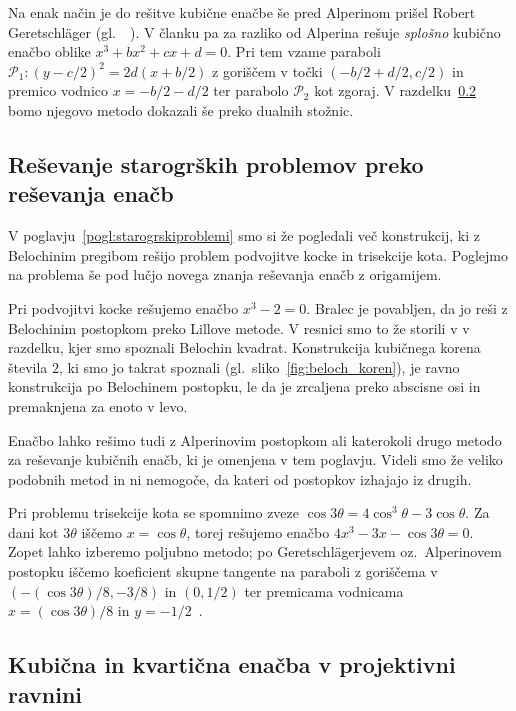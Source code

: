\begin{opomba}
    \label{opom:geret_metoda}
    Na enak način je do rešitve kubične enačbe še pred Alperinom prišel Robert Geretschläger (gl.\ ~\cite[368--369]{geret1995}). V članku pa za razliko od Alperina rešuje \emph{splošno} kubično enačbo oblike $x^3 + bx^2 + cx + d = 0$. Pri tem vzame paraboli $\mathcal{P}_1: (y-c/2)^2 = 2d(x+b/2)$ z goriščem v točki $(-b/2+d/2, c/2)$ in premico vodnico $x = -b/2-d/2$ ter parabolo $\mathcal{P}_2$ kot zgoraj. V razdelku~\ref{podpogl:afina_proj_enacbe} bomo njegovo metodo dokazali še preko dualnih stožnic.
\end{opomba}

\subsection{Reševanje starogrških problemov preko reševanja enačb}

V poglavju~\ref{pogl:starogrskiproblemi} smo si že pogledali več konstrukcij, ki z Belochinim pregibom rešijo problem podvojitve kocke in trisekcije kota. Poglejmo na problema še pod lučjo novega znanja reševanja enačb z origamijem.

Pri podvojitvi kocke rešujemo enačbo $x^3 - 2 = 0$. Bralec je povabljen, da jo reši z Belochinim postopkom preko Lillove metode. V resnici smo to že storili v v razdelku, kjer smo spoznali Belochin kvadrat. Konstrukcija kubičnega korena števila $2$, ki smo jo takrat spoznali (gl.\ sliko~\ref{fig:beloch_koren}), je ravno konstrukcija po Belochinem postopku, le da je zrcaljena preko abscisne osi in premaknjena za enoto v levo.

Enačbo lahko rešimo tudi z Alperinovim postopkom ali katerokoli drugo metodo za reševanje kubičnih enačb, ki je omenjena v tem poglavju. Videli smo že veliko podobnih metod in ni nemogoče, da kateri od postopkov izhajajo iz drugih.

Pri problemu trisekcije kota se spomnimo zveze $\cos 3\theta = 4 \cos^3 \theta - 3 \cos \theta$. Za dani kot $3 \theta$ iščemo $x = \cos \theta$, torej rešujemo enačbo $4x^3-3x-\cos 3\theta=0$. Zopet lahko izberemo poljubno metodo; po Geretschlägerjevem oz.\ Alperinovem postopku iščemo koeficient skupne tangente na paraboli z goriščema v $(-(\cos 3 \theta) / 8, -3/8)$ in $(0, 1/2)$ ter premicama vodnicama $x = (\cos 3 \theta) / 8$ in $y = -1/2$~\cite[str.\ 370]{geret1995}.

\subsection{Kubična in kvartična enačba v projektivni ravnini}
\label{podpogl:afina_proj_enacbe}


